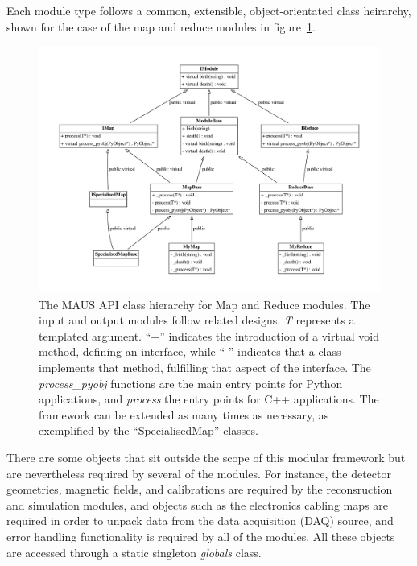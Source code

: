 \documentclass{JINST}
\begin{document}
\noindent Each module type follows a common, extensible, object-orientated class heirarchy, shown for the case of the map and reduce modules in figure~\ref{fig:api}. 

\begin{figure}[!htb]
\centering
\includegraphics[width=1.0\textwidth]{figs/api.pdf}
\caption{The MAUS API class hierarchy for Map and Reduce modules. The input and output modules follow related designs. \emph{T} represents a templated argument. ``+'' indicates the introduction of a virtual void method, defining an interface, while ``-'' indicates that a class implements that method, fulfilling that aspect of the interface. The  \emph{process\_pyobj} functions are the main entry points for Python applications, and \emph{process} the entry points for C++ applications. The framework can be extended as many times as  necessary, as exemplified by the ``SpecialisedMap'' classes.}
\label{fig:api}
\end{figure}

There are some objects that sit outside the scope of this modular framework but are nevertheless required by several of the modules. For instance,  the detector geometries, magnetic fields, and calibrations are required by the reconsruction and simulation modules, and objects such as the electronics cabling maps are required in order to unpack data from the data acquisition (DAQ) source, and error handling functionality is required by all of the modules. All these objects are accessed through a static singleton \emph{globals} class. 
\end{document}
